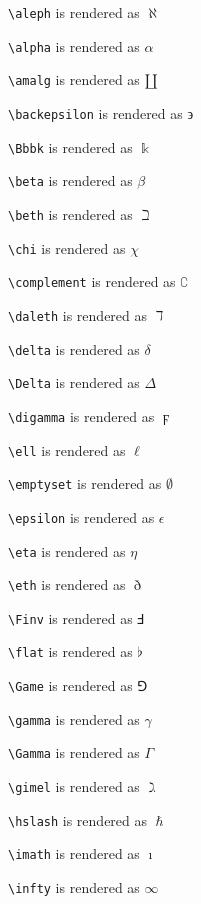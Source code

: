 \texttt{\textbackslash aleph} is rendered as $\aleph$


\texttt{\textbackslash alpha} is rendered as $\alpha$


\texttt{\textbackslash amalg} is rendered as $\amalg$


\texttt{\textbackslash backepsilon} is rendered as $\backepsilon$


\texttt{\textbackslash Bbbk} is rendered as $\Bbbk$


\texttt{\textbackslash beta} is rendered as $\beta$


\texttt{\textbackslash beth} is rendered as $\beth$


\texttt{\textbackslash chi} is rendered as $\chi$


\texttt{\textbackslash complement} is rendered as $\complement$


\texttt{\textbackslash daleth} is rendered as $\daleth$


\texttt{\textbackslash delta} is rendered as $\delta$


\texttt{\textbackslash Delta} is rendered as $\Delta$


\texttt{\textbackslash digamma} is rendered as $\digamma$


\texttt{\textbackslash ell} is rendered as $\ell$


\texttt{\textbackslash emptyset} is rendered as $\emptyset$


\texttt{\textbackslash epsilon} is rendered as $\epsilon$


\texttt{\textbackslash eta} is rendered as $\eta$


\texttt{\textbackslash eth} is rendered as $\eth$


\texttt{\textbackslash Finv} is rendered as $\Finv$


\texttt{\textbackslash flat} is rendered as $\flat$


\texttt{\textbackslash Game} is rendered as $\Game$


\texttt{\textbackslash gamma} is rendered as $\gamma$


\texttt{\textbackslash Gamma} is rendered as $\Gamma$


\texttt{\textbackslash gimel} is rendered as $\gimel$


\texttt{\textbackslash hslash} is rendered as $\hslash$


\texttt{\textbackslash imath} is rendered as $\imath$


\texttt{\textbackslash infty} is rendered as $\infty$



